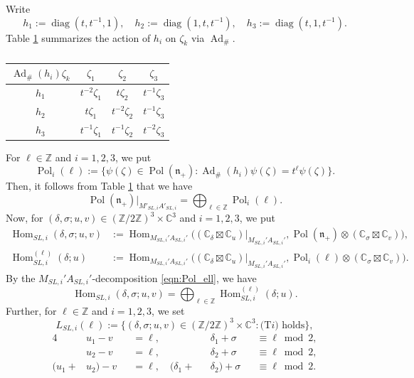 \documentclass[a4paper,11pt,reqno]{amsart}
\newcommand{\frakn}{\mathfrak{n}}
\newcommand{\0}{{\bf 0}}
\newcommand{\Z}{\mathbb{Z}}
\newcommand{\C}{\mathbb{C}}
\newcommand{\1}{{\bf 1}}
\DeclareMathOperator{\Ad}{Ad}
\DeclareMathOperator{\Hom}{Hom}
\DeclareMathOperator{\Pol}{Pol}
\DeclareMathOperator{\diag}{diag}
\theoremstyle{plain}
\theoremstyle{definition}
\numberwithin{equation}{section}
\theoremstyle{definition}
\begin{document}
Write
\begin{equation*}
h_{1}:=\diag(t, t^{-1},1),
\quad
h_{2}:=\diag(1,t, t^{-1}),
\quad
h_{3}:=\diag(t, 1, t^{-1}).
\end{equation*}
Table \ref{table:Adzeta} summarizes 
the action of $h_{i}$ on $\zeta_k$ via $\Ad_{\#}$. 
\begin{table}[t]
\caption{}
\begin{center}
\renewcommand{\arraystretch}{1.3}
{
\begin{tabular}{c|c|c|c}
\hline
$\Ad_{\#}(h_i)\zeta_k$ & $\zeta_1$ & $\zeta_2$ & $\zeta_3$\\
\hline
$h_1$ & $t^{- 2}\zeta_1$ & $t\zeta_2$ & $t^{-1}\zeta_3$\\
\hline
$h_2$ & $t\zeta_1 $ & $t^{-2}\zeta_2$ & $t^{-1} \zeta_3$\\
\hline
$h_3$ & $t^{-1} \zeta_1$ & $t^{-1} \zeta_2$ & $t^{- 2}\zeta_3$\\
\hline
\end{tabular}
}
\end{center}\label{table:Adzeta}
\end{table}
For $\ell \in \Z$ and $i=1,2,3$, we put
\begin{equation*}
\Pol_{i}(\ell):=\{\psi(\zeta) \in \Pol(\frakn_+): \Ad_{\#}(h_i)\psi(\zeta) = t^\ell \psi(\zeta)\}.
\end{equation*}
Then, it follows from Table \ref{table:Adzeta} that we have
\begin{equation}\label{eqn:Pol_ell}
\Pol(\frakn_+)\big\vert_{M'_{SL,i}A'_{SL,i}}=\bigoplus_{\ell \in \Z} \Pol_{i}(\ell).
\end{equation}
Now, for $(\delta,\sigma; u, v) \in (\Z/2\Z)^3\times \C^3$ and $i=1,2,3$, we put
\begin{align*}
\Hom_{SL,i}(\delta,\sigma; u, v)
&:=\Hom_{M_{SL,i}'A_{SL,i}'}\big((\C_\delta\boxtimes \C_{u})
\big\rvert_{M_{SL,i}'A_{SL,i}'},\Pol(\frakn_+)\otimes (\C_\sigma\boxtimes \C_{v})\big),
\\
\Hom^{(\ell)}_{SL,i}(\delta; u)
&:=\Hom_{M_{SL,i}'A_{SL,i}'}\big((\C_\delta\boxtimes \C_{u})
\big\rvert_{M_{SL,i}'A_{SL,i}'},\Pol_i(\ell)\otimes (\C_\sigma\boxtimes \C_{v})\big).
\end{align*}
By the $M_{SL,i}'A_{SL,i}'$-decomposition \eqref{eqn:Pol_ell}, we have 
\begin{equation}\label{eqn:HomSL}
\Hom_{SL,i}(\delta,\sigma; u, v)
=\bigoplus_{\ell \in \Z} \Hom^{(\ell)}_{SL,i}(\delta; u).
\end{equation}
Further, for $\ell  \in \Z$ and $i=1,2,3$, we set
\begin{equation*}
L_{SL,i}(\ell):=\{(\delta,\sigma; u, v) \in (\Z/2\Z)^3\times \C^3: 
\text{(T$i$)  holds}  \},
\end{equation*}
\begin{alignat}{4}
&u_1-v &&= \ell,
\quad
&&\delta_1+\sigma
&&\equiv \ell \bmod{2},
\tag{T1}\\
&u_2-v &&= \ell,
\quad
&&\delta_2+\sigma &&\equiv \ell \bmod{2},
\tag{T2}\\
(u_1+&u_2)-v &&= \ell,
\quad
(\delta_1+&&\delta_2)+\sigma &&\equiv \ell \bmod{2}.
\tag{T3}
\end{alignat}
\end{document}
